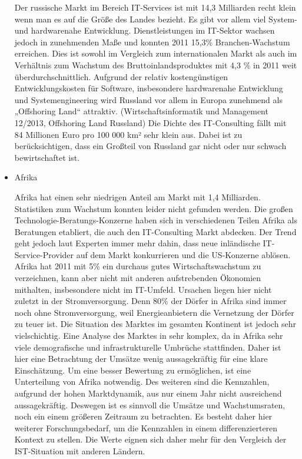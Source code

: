 \begin{itemize}
Der russische Markt im Bereich IT-Services ist mit 14,3 Milliarden recht klein wenn man es auf die Größe des Landes bezieht. Es gibt vor allem viel System- und hardwarenahe Entwicklung. Dienstleistungen im IT-Sektor wachsen jedoch in zunehmenden Maße und konnten 2011 15,3\% Branchen-Wachstum erreichen. Dies ist sowohl im Vergleich zum internationalen Markt als auch im Verhältnis zum Wachstum des Bruttoinlandsproduktes mit 4,3 \% in 2011 weit überdurchschnittlich. \cite{statRus2} Aufgrund der relativ kostengünstigen Entwicklungskosten für Software, insbesondere hardwarenahe Entwicklung und Systemengineering wird Russland vor allem in Europa zunehmend als „Offshoring Land“ attraktiv. (Wirtschaftsinformatik und Management 12/2013, Offshoring Land Russland)
Die Dichte des IT-Consulting fällt mit 84 Millionen Euro pro 100 000 km² sehr klein aus. Dabei ist zu berücksichtigen, dass ein Großteil von Russland gar nicht oder nur schwach bewirtschaftet ist. \cite{statRus}


\item {Afrika}

Afrika hat einen sehr niedrigen Anteil am Markt mit 1,4 Milliarden. \cite{statAfr} Statistiken zum Wachstum konnten leider nicht gefunden werden. Die großen Technologie-Beratungs-Konzerne haben sich in verschiedenen Teilen Afrika als Beratungen etabliert, die auch den IT-Consulting Markt abdecken. Der Trend geht jedoch laut Experten immer mehr dahin, dass neue inländische IT-Service-Provider auf dem Markt konkurrieren und die US-Konzerne ablösen. Afrika hat 2011 mit 5\% ein durchaus gutes Wirtschaftswachstum zu verzeichnen, kann aber nicht mit anderen aufstrebenden Ökonomien mithalten, insbesondere nicht im IT-Umfeld. \cite{statAfr2}
Ursachen liegen hier nicht zuletzt in der Stromversorgung. Denn 80\% der Dörfer in Afrika sind immer noch ohne Stromversorgung, weil Energieanbietern die Vernetzung der Dörfer zu teuer ist.  \cite{dieZeit}
Die Situation des Marktes im gesamten Kontinent ist jedoch sehr vielschichtig. Eine Analyse des Marktes in sehr komplex, da in Afrika sehr viele demografische und infrastrukturelle Umbrüche stattfinden. Daher ist hier eine Betrachtung der Umsätze wenig aussagekräftig für eine klare Einschätzung. 
Um eine besser Bewertung zu ermöglichen, ist eine Unterteilung von Afrika notwendig. Des weiteren sind die Kennzahlen, aufgrund der hohen Marktdynamik, aus nur einem Jahr nicht ausreichend aussagekräftig. Deswegen ist es sinnvoll die Umsätze und Wachstumsraten, noch ein einem größeren Zeitraum zu betrachten.
Es besteht daher hier weiterer Forschungsbedarf, um die Kennzahlen in einem differenzierteren Kontext zu stellen.
Die Werte eignen sich daher mehr für den Vergleich der IST-Situation mit anderen Ländern.



\end{itemize}
